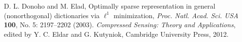 \documentclass[12pt]{article}
\begin{document}
\begin{thebibliography}{99}
D. L. Donoho and M. Elad, Optimally sparse representation in general (nonorthogonal) dictionaries via $\ell^1$ minimization, {\it Proc. Natl. Acad. Sci. USA} {\bf 100}, No. 5: 2197--2202 (2003). 
{\it Compressed Sensing: Theory and Applications}, edited by Y. C. Eldar and G. Kutyniok, Cambridge University Press, 2012.
\end{thebibliography}

\end{document}
